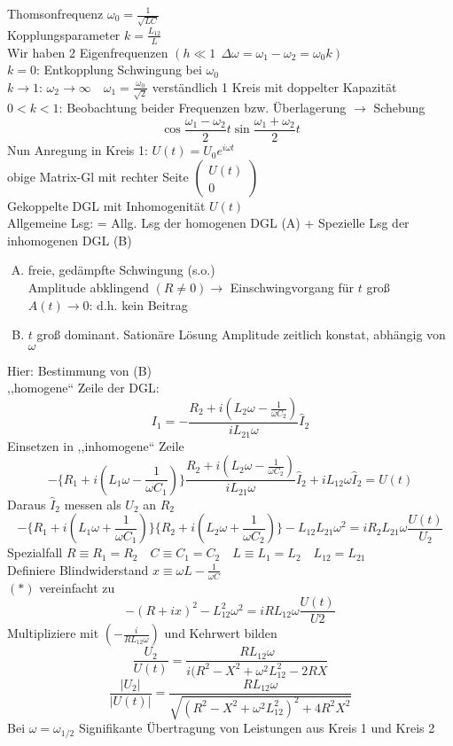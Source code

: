 \documentclass[titlepage,12pt,a4paper,ngerman]{report}
\begin{document}
Thomsonfrequenz $ \omega_0 = \frac{1}{\sqrt{LC}} $\\
Kopplungsparameter $ k = \frac{L_{12}}{L} $\\
Wir haben 2 Eigenfrequenzen $ (h\ll1\ \ \Delta \omega = \omega_1 - \omega_2 = \omega_0 k) $\\
$ k=0 $: Entkopplung Schwingung bei $ \omega_0 $\\
$ k \rightarrow 1 $: $ \omega_2 \rightarrow \infty \quad \omega_1 = \frac{\omega_0}{\sqrt{2}} $ verständlich 1 Kreis mit doppelter Kapazität\\
$ 0<k<1 $: Beobachtung beider Frequenzen bzw. Überlagerung $ \rightarrow $ Schebung
$$\cos\frac{\omega_1 - \omega_2}{2} t \sin \frac{\omega_1 + \omega_2}{2} t$$
Nun Anregung in Kreis 1: $ U(t) = U_0 e^{i\omega t} $\\
obige Matrix-Gl mit rechter Seite $ \begin{pmatrix}
U(t)\\0
\end{pmatrix} $\\
Gekoppelte DGL mit Inhomogenität $ U(t) $\\
Allgemeine Lsg: = Allg. Lsg der homogenen DGL (A) + Spezielle Lsg der inhomogenen DGL (B)

\begin{enumerate}[(A)]
	\item freie, gedämpfte Schwingung (s.o.)\\
	Amplitude abklingend $ (R\neq 0) \rightarrow $ Einschwingvorgang für $ t $ groß $ A(t) \rightarrow 0 $: d.h. kein Beitrag
	\item $ t $ groß dominant. Sationäre Lösung Amplitude zeitlich konstat, abhängig von $ \omega $
\end{enumerate}
Hier: Bestimmung von (B)\\
,,homogene`` Zeile der DGL: $$I_1 = - \frac{R_2 + i(L_2 \omega - \frac{1}{\omega C_2})}{i L_{21} \omega} \hat{I}_2$$
Einsetzen in ,,inhomogene`` Zeile
$$- \{ R_1 + i(L_1 \omega - \frac{1}{\omega C_1})\} \frac{R_2 + i (L_2 \omega - \frac{1}{\omega C_2})}{i L_{21} \omega} \hat{I}_2 + i L_{12} \omega \hat{I}_2 = U(t) $$
Daraus $ \hat{I}_2 $ messen als $ U_2 $ an $ R_2 $
\begin{equation}
- \{R_1 + i(L_1\omega + \frac{1}{\omega C_1})\} \{R_2 + i(L_2 \omega + \frac{1}{\omega C_2})\} - L_{12} L_{21} \omega^2 = i R_2 L_{21} \omega \frac{U(t)}{U_2} \tag{$*$}
\end{equation}
Spezialfall $ R \equiv R_1 = R_2 \quad C \equiv C_1 = C_2 \quad L \equiv L_1 = L_2 \quad L_{12} = L_{21} $\\
Definiere Blindwiderstand $ x \equiv \omega L - \frac{1}{\omega C} $\\
$ (*) $ vereinfacht zu 
$$ -(R + ix)^2 - L_{12}^2 \omega^2 = i R L_{12} \omega \frac{U(t)}{U2}$$
Multipliziere mit $ (-\frac{i}{R L_{12} \omega}) $ und Kehrwert bilden 
$$\frac{U_2}{U(t)} = \frac{R L_{12} \omega}{i(R^2 - X^2 + \omega^2 L_{12}^2 - 2 R X}$$
$$\frac{|U_2|}{|U(t)|} = \frac{R L_{12} \omega}{\sqrt{(R^2 - X^2 + \omega^2 L_{12}^2)^2 + 4 R^2 X^2}}$$
Bei $ \omega = \omega_{1/2} $ Signifikante Übertragung von Leistungen aus Kreis 1 und Kreis 2
\end{document}
